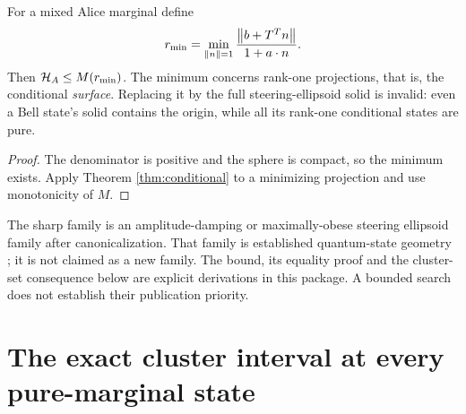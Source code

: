 \begin{corollary}
For a mixed Alice marginal define
\[
 r_{\min}=\min_{\left\lVert n\right\rVert=1}
       \frac{\left\lVert b+T^Tn\right\rVert}{1+a\cdot n}.
\]
Then $\mathcal H_A\leq M(r_{\min})$. The minimum concerns rank-one projections,
that is, the conditional \emph{surface}. Replacing it by the full
steering-ellipsoid solid is invalid: even a Bell state's solid contains
the origin, while all its rank-one conditional states are pure.
\end{corollary}
\begin{proof}
The denominator is positive and the sphere is compact, so the minimum
exists. Apply Theorem \ref{thm:conditional} to a minimizing projection
and use monotonicity of $M$.
\end{proof}

The sharp family is an amplitude-damping or maximally-obese steering
ellipsoid family after canonicalization. That family is established
quantum-state geometry \cite{milne}; it is not claimed as a new family. The bound,
its equality proof and the cluster-set consequence below are explicit
derivations in this package. A bounded search does not establish their
publication priority.

\section{The exact cluster interval at every pure-marginal state}\label{sec:cluster}

